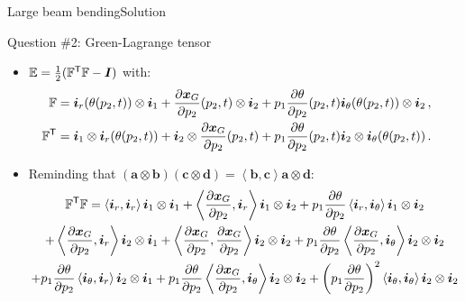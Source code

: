 \documentclass{beamer}
\newcommand{\demi}{\frac{1}{2}}
\newcommand{\itr}{{\sf T}}
\newcommand{\Id}{{\boldsymbol I}}
\newcommand{\aj}{a}
\newcommand{\bj}{b}
\newcommand{\cj}{c}
\renewcommand{\dj}{d}
\newcommand{\av}{{\boldsymbol\aj}}
\newcommand{\bv}{{\boldsymbol\bj}}
\newcommand{\cv}{{\boldsymbol\cj}}
\newcommand{\dv}{{\boldsymbol\dj}}
\newcommand{\xj}{x}
\newcommand{\xv}{{\boldsymbol\xj}}
\renewcommand{\ij}{i}
\newcommand{\pj}{p}
\newcommand{\iv}{{\boldsymbol\ij}}
\newcommand{\Fp}{{\mathbb F}}
\newcommand{\GreenLj}{E}
\newcommand{\GreenL}{{\mathbb\GreenLj}}
\newcommand{\scal}[1]{\left\langle{#1}\right\rangle}
\begin{document}
\begin{frame}{Large beam bending}{Solution}
\begin{overprint}
\vskip-20pt
\begin{exampleblock}{Question \#2: Green-Lagrange tensor}
\begin{itemize}
\item $\GreenL=\demi(\Fp^\itr\Fp-\Id)$ with:
\vskip-10pt
{\scriptsize
\begin{displaymath}
\begin{split}
\!\!\!\!\!\!\!\!\Fp &=\iv_r(\theta(\pj_2,t))\otimes\iv_1+\frac{\partial\xv_G}{\partial\pj_2}(\pj_2,t)\otimes\iv_2+\pj_1\frac{\partial\theta}{\partial\pj_2}(\pj_2,t)\iv_\theta(\theta(\pj_2,t))\otimes\iv_2\,, \\
\!\!\!\!\!\!\!\!\Fp^\itr &=\iv_1\otimes\iv_r(\theta(\pj_2,t))+\iv_2\otimes\frac{\partial\xv_G}{\partial\pj_2}(\pj_2,t)+\pj_1\frac{\partial\theta}{\partial\pj_2}(\pj_2,t)\iv_2\otimes\iv_\theta(\theta(\pj_2,t))\,.
\end{split}
\end{displaymath}}
\item Reminding that $(\av\otimes\bv)(\cv\otimes\dv)=\scal{\bv,\cv}\av\otimes\dv$:
{\scriptsize
\begin{multline*}
\Fp^\itr\Fp=\scal{\iv_r,\iv_r}\iv_1\otimes\iv_1+\scal{\frac{\partial\xv_G}{\partial\pj_2},\iv_r}\iv_1\otimes\iv_2+\pj_1\frac{\partial\theta}{\partial\pj_2}\scal{\iv_r,\iv_\theta}\iv_1\otimes\iv_2 \\
+\scal{\frac{\partial\xv_G}{\partial\pj_2},\iv_r}\iv_2\otimes\iv_1+\scal{\frac{\partial\xv_G}{\partial\pj_2},\frac{\partial\xv_G}{\partial\pj_2}}\iv_2\otimes\iv_2+\pj_1\frac{\partial\theta}{\partial\pj_2}\scal{\frac{\partial\xv_G}{\partial\pj_2},\iv_\theta}\iv_2\otimes\iv_2 \\
+\pj_1\frac{\partial\theta}{\partial\pj_2}\scal{\iv_\theta,\iv_r}\iv_2\otimes\iv_1+\pj_1\frac{\partial\theta}{\partial\pj_2}\scal{\frac{\partial\xv_G}{\partial\pj_2},\iv_\theta}\iv_2\otimes\iv_2+\left(\pj_1\frac{\partial\theta}{\partial\pj_2}\right)^2\scal{\iv_\theta,\iv_\theta}\iv_2\otimes\iv_2
\end{multline*}}
\end{itemize}
\end{exampleblock}


\end{overprint}
\end{frame}
\end{document}
